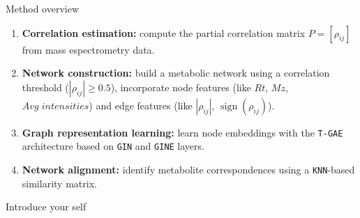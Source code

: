 \documentclass[aspectratio=169]{beamer}
\renewcommand{\alert}[1]{\textbf{\color{swufe}#1}}
\begin{document}
    \begin{frame}{Method overview}

        \begin{enumerate}
            \item \alert{Correlation estimation:} compute the partial correlation matrix $P = [\rho_{ij}]$ from mass espectrometry data.
            \item \alert{Network construction:} build a metabolic network using a correlation threshold ($|\rho_{ij}| \geq 0.5$), incorporate node features (like $Rt$, $Mz$, $Avg\; intensities$) and edge features (like $|\rho_{ij}|$, $\operatorname{sign}(\rho_{ij})$).
            \item \alert{Graph representation learning:} learn node embeddings with the \texttt{T-GAE} architecture based on \texttt{GIN} and \texttt{GINE} layers.
            \item \alert{Network alignment:} identify metabolite correspondences using a \texttt{KNN}-based similarity matrix.
        \end{enumerate}

        \begin{note}
            {Introduce your self}
        \end{note}
    \end{frame}
\end{document}
